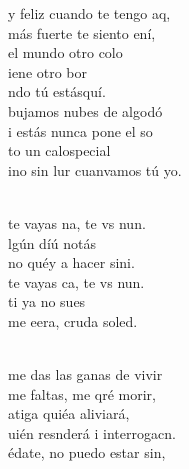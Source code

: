 \documentclass[12pt]{article}
\begin{document}
\begin{multicols*}{2}
\begin{cancion}%
	y feliz cuando te tengo aq,\\
	 más fuerte te siento ení,\\
	el mundo  otro colo\\
	iene otro bor \\
	ndo tú estásquí.\\
	bujamos nubes de algodó\\
	i estás nunca pone el so\\
	to un calospecial \\
	ino sin lur cuanvamos tú yo.\\\jump\\
	\begin{chorus}%
	 te vayas na, te vs nun.\\
	lgún díú notás\\
	no  quéy a hacer sini. \\
	 te vayas ca, te vs nun.\\
	ti ya no  sues\\
	me eera, cruda soled.\\
	\end{chorus}%
	\jump\\
	 me das las ganas de vivir\\
	me faltas, me qré morir,\\
	atiga quiéa aliviará,\\
	uién resnderá i interrogacn. \\
	édate, no puedo estar sin,\\

\end{cancion}
\end{multicols*}
\end{document}
